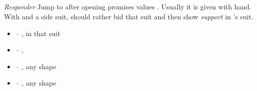 \subsection{}
\label{subsec:jacoby}

\emph{Responder} Jump to \ctr{2\nt} after \ctr{1\major} opening promises \gf\/ values \ws{}. Usually it is given with
\bal\/ hand. With  and a side  suit, \resp should rather bid that suit and then show
\emph{support} in \opn's suit.

\begin{itemize}
  \item {} -- ,  in that suit
  \item {} -- , \bal
  \item \ctr{3\nt} -- , any shape
  \item {} -- , any shape
\end{itemize}
